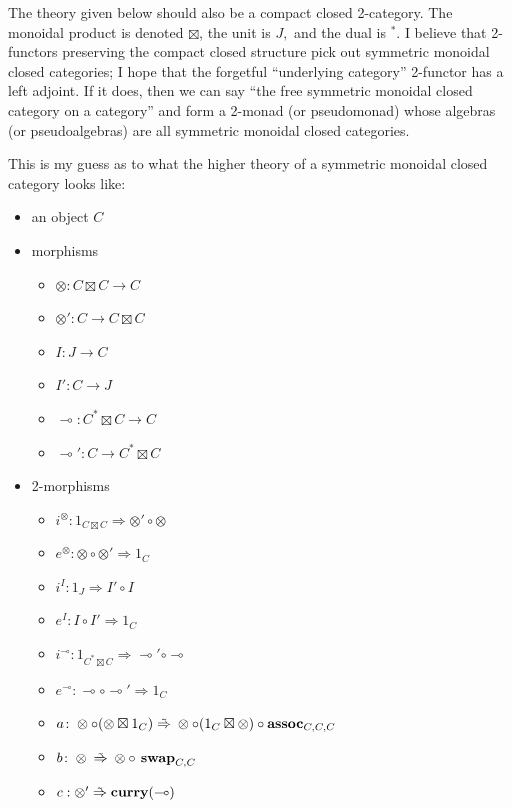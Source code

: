 \documentclass[12pt,twoside,openright]{report}
\newcommand{\maps}{\colon}
\newcommand{\lhom}{\multimap}
\newcommand{\tensor}{\otimes}
\newcommand{\mbold}[1]{\mbox{\bf #1}}
\newcommand{\too}{\Rightarrow}
\newcommand{\isotoo}{\; \tilde{\Rightarrow} \;}
\begin{document}
The theory given below should also be a compact closed 2-category.  The monoidal product is denoted $\boxtimes$, the unit is $J,$ and the dual is ${}^*.$  I believe that 2-functors preserving the compact closed structure pick out symmetric monoidal closed categories; I hope that the forgetful ``underlying category'' 2-functor has a left adjoint.  If it does, then we can say ``the free symmetric monoidal closed category on a category'' and form a 2-monad (or pseudomonad) whose algebras (or pseudoalgebras) are all symmetric monoidal closed categories.

This is my guess as to what the higher theory of a symmetric monoidal closed category looks like:
\begin{itemize}
  \item an object $C$
  \item morphisms
  \begin{itemize}
    \item $\tensor \maps C \boxtimes C \to C$
    \item $\tensor' \maps C \to C \boxtimes C$
    \item $I \maps J \to C$
    \item $I' \maps C \to J$
    \item $\lhom \maps C^* \boxtimes C \to C$
    \item $\lhom' \maps C \to C^* \boxtimes C$
  \end{itemize}
  \item 2-morphisms
  \begin{itemize}
    \item $i^\tensor\maps 1_{C \boxtimes C} \too \tensor' \circ \tensor$
    \item $e^\tensor\maps \tensor \circ \tensor' \too 1_C$\\

    \item $i^I\maps 1_J \too I' \circ I$
    \item $e^I\maps I \circ I' \too 1_C$\\

    \item $i^\lhom\maps 1_{C^* \boxtimes C} \too \lhom' \circ \lhom$
    \item $e^\lhom\maps \lhom \circ \lhom' \too 1_C$\\

    \item $a\maps \tensor \circ (\tensor \boxtimes 1_C) \isotoo \tensor \circ (1_C \boxtimes \tensor) \circ \mbold{assoc}_{C, C, C}$
    \item $b\maps \tensor \isotoo \tensor \circ \mbold{~swap}_{C, C}$
    \item $c:\tensor' \isotoo \mbold{curry}(\lhom)$
    

\end{itemize}
\end{itemize}
\end{document}
